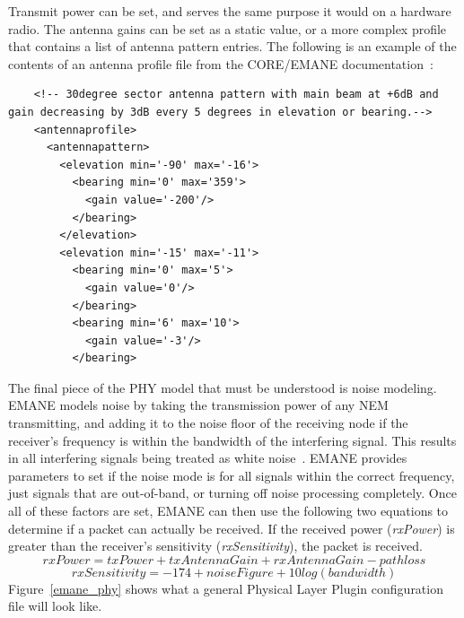 Transmit power can be set, and serves the same purpose it would on a hardware radio.
The antenna gains can be set as a static value, or a more complex profile that contains a list of antenna pattern entries.
The following is an example of the contents of an antenna profile file from the CORE/EMANE documentation~\cite{core}:
\begin{center}
\begin{minipage}{\textwidth}
    \begin{verbatim}
    <!-- 30degree sector antenna pattern with main beam at +6dB and gain decreasing by 3dB every 5 degrees in elevation or bearing.-->
    <antennaprofile>
      <antennapattern>
        <elevation min='-90' max='-16'>
          <bearing min='0' max='359'>
            <gain value='-200'/>
          </bearing>
        </elevation>
        <elevation min='-15' max='-11'>
          <bearing min='0' max='5'>
            <gain value='0'/>
          </bearing>
          <bearing min='6' max='10'>
            <gain value='-3'/>
          </bearing>
    \end{verbatim}
\end{minipage}
\end{center}\par
The final piece of the PHY model that must be understood is noise modeling.
EMANE models noise by taking the transmission power of any NEM transmitting, and adding it to the noise floor of the receiving node if the receiver's frequency is within the bandwidth of the interfering signal.
This results in all interfering signals being treated as white noise~\cite{emane_phy}.
EMANE provides parameters to set if the noise mode is for all signals within the correct frequency, just signals that are out-of-band, or turning off noise processing completely.
Once all of these factors are set, EMANE can then use the following two equations to determine if a packet can actually be received.
If the received power (\textit{rxPower}) is greater than the receiver's sensitivity (\textit{rxSensitivity}), the packet is received.
\[ rxPower = txPower + txAntennaGain + rxAntennaGain - pathloss \]
\[ rxSensitivity = -174 + noiseFigure + 10log(bandwidth) \]
Figure~\ref{emane_phy} shows what a general Physical Layer Plugin configuration file will look like.\par

